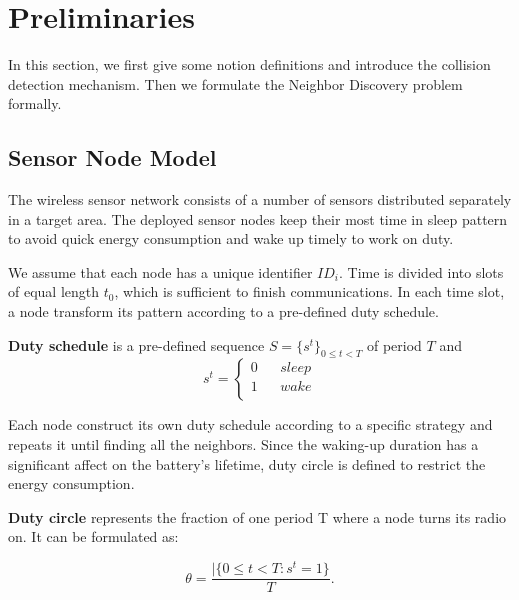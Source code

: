 \section{Preliminaries}
\label{sectionmodel}

In this section, we first give some notion definitions and introduce the collision detection mechanism. 
Then we formulate the Neighbor Discovery problem formally.  


\subsection{Sensor Node Model}

The wireless sensor network consists of a number of sensors distributed separately in a target area.
The deployed sensor nodes keep their most time in sleep pattern to avoid quick energy consumption 
and wake up timely to work on duty.

We assume that each node has a unique identifier $ID_i$. Time is divided into slots of equal length $t_0$, 
which is sufficient to finish communications. In each time slot, a node transform its pattern according to a pre-defined duty schedule.

\begin{definition}
\textbf{Duty schedule} is a pre-defined sequence $S=\{s^t\}_{0\leq t<T}$ of period $T$ and
$$ s^t=\left\{
\begin{aligned}
0  & & {sleep}\\
1  & & {wake}\\
\end{aligned}
\right.
$$
\end{definition}

 Each node construct its own duty schedule according to a specific strategy and repeats it
 until finding all the neighbors. Since the waking-up duration has a significant affect on the battery's lifetime, 
 duty circle is defined to restrict the energy consumption.

\begin{definition}
\textbf{Duty circle} represents the fraction of one period T where a node turns its radio on. It can be formulated as:

$$\theta=\frac{|\{ 0\leq t<T : s^t =1\}}{T}.
$$
  
\end{definition}

